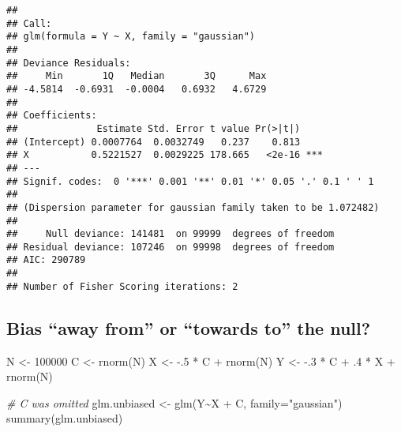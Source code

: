 \documentclass[
]{book}
\newenvironment{Shaded}{\begin{snugshade}}{\end{snugshade}}
\newcommand{\AttributeTok}[1]{\textcolor[rgb]{0.77,0.63,0.00}{#1}}
\newcommand{\CommentTok}[1]{\textcolor[rgb]{0.56,0.35,0.01}{\textit{#1}}}
\newcommand{\DecValTok}[1]{\textcolor[rgb]{0.00,0.00,0.81}{#1}}
\newcommand{\FunctionTok}[1]{\textcolor[rgb]{0.00,0.00,0.00}{#1}}
\newcommand{\NormalTok}[1]{#1}
\newcommand{\OtherTok}[1]{\textcolor[rgb]{0.56,0.35,0.01}{#1}}
\newcommand{\SpecialCharTok}[1]{\textcolor[rgb]{0.00,0.00,0.00}{#1}}
\newcommand{\StringTok}[1]{\textcolor[rgb]{0.31,0.60,0.02}{#1}}
\begin{document}
\begin{verbatim}
## 
## Call:
## glm(formula = Y ~ X, family = "gaussian")
## 
## Deviance Residuals: 
##     Min       1Q   Median       3Q      Max  
## -4.5814  -0.6931  -0.0004   0.6932   4.6729  
## 
## Coefficients:
##              Estimate Std. Error t value Pr(>|t|)    
## (Intercept) 0.0007764  0.0032749   0.237    0.813    
## X           0.5221527  0.0029225 178.665   <2e-16 ***
## ---
## Signif. codes:  0 '***' 0.001 '**' 0.01 '*' 0.05 '.' 0.1 ' ' 1
## 
## (Dispersion parameter for gaussian family taken to be 1.072482)
## 
##     Null deviance: 141481  on 99999  degrees of freedom
## Residual deviance: 107246  on 99998  degrees of freedom
## AIC: 290789
## 
## Number of Fisher Scoring iterations: 2
\end{verbatim}

\hypertarget{bias-away-from-or-towards-to-the-null}{%
\subsection{Bias ``away from'' or ``towards to'' the null?}\label{bias-away-from-or-towards-to-the-null}}

\begin{Shaded}
\begin{Highlighting}[]
\NormalTok{N }\OtherTok{\textless{}{-}} \DecValTok{100000}
\NormalTok{C }\OtherTok{\textless{}{-}} \FunctionTok{rnorm}\NormalTok{(N)}
\NormalTok{X }\OtherTok{\textless{}{-}} \SpecialCharTok{{-}}\NormalTok{.}\DecValTok{5} \SpecialCharTok{*}\NormalTok{ C }\SpecialCharTok{+} \FunctionTok{rnorm}\NormalTok{(N)}
\NormalTok{Y }\OtherTok{\textless{}{-}} \SpecialCharTok{{-}}\NormalTok{.}\DecValTok{3} \SpecialCharTok{*}\NormalTok{ C }\SpecialCharTok{+}\NormalTok{ .}\DecValTok{4} \SpecialCharTok{*}\NormalTok{ X }\SpecialCharTok{+} \FunctionTok{rnorm}\NormalTok{(N)}
\end{Highlighting}
\end{Shaded}

\begin{Shaded}
\begin{Highlighting}[]
\CommentTok{\# C was omitted}
\NormalTok{glm.unbiased }\OtherTok{\textless{}{-}} \FunctionTok{glm}\NormalTok{(Y}\SpecialCharTok{\textasciitilde{}}\NormalTok{X }\SpecialCharTok{+}\NormalTok{ C, }\AttributeTok{family=}\StringTok{"gaussian"}\NormalTok{)}
\FunctionTok{summary}\NormalTok{(glm.unbiased)}
\end{Highlighting}
\end{Shaded}
\end{document}
